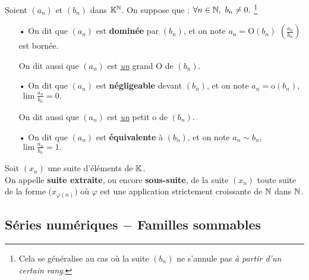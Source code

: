 \noindent Soient $(a_n)$ et $(b_n)$ dans $\mathbb{K}^{\mathbb{N}}$. On suppose que : \(\forall n\in \mathbb{N},\ b_n\neq 0 . \ \)\footnote{Cela se généralise au cas où la suite $(b_n)$ ne s'annule pas \emph{à partir d'un certain rang}.}\vspace{-0.2cm}
\begin{itemize}[leftmargin=0.5cm]
    \item[•] On dit que $(a_n)$ est \textbf{dominée} par $(b_n)$, et on note \(a_n=\text{O}(b_n)\) \ssi \(\displaystyle \left( \frac{a_n}{b_n} \right)\) est bornée.\\
    \begin{small}
        On dit aussi que \((a_n)\) est \underline{\emph{un}} grand O de \((b_n)\).
    \end{small}
    \vspace{0.1cm}
    
    \item[•] On dit que $(a_n)$ est \textbf{négligeable} devant $(b_n)$, et on note \(a_n=\text{o}(b_n)\), \ssi \(\ \displaystyle \lim \frac{a_n}{b_n}=0.  \)\\
    \begin{small}
        On dit aussi que \((a_n)\) est \underline{\emph{un}} petit o de \((b_n)\).
    \end{small}
    \vspace{0.1cm}
    
    \item[•] On dit que \((a_n)\) est \textbf{équivalente} à \((b_n)\), et on note \(a_n\sim b_n\), \ssi \(\ \displaystyle \lim\frac{a_n}{b_n}=1. \) 
\end{itemize}

\vspace{0.8cm}

Soit \((x_n)\) une suite d'éléments de \(\mathbb{K}\). \\
On appelle \textbf{suite extraite}, ou encore \textbf{sous-suite}, de la suite \((x_n)\) toute suite de la forme \(\displaystyle \bigl(x_{\varphi (n)}\bigr)\) où \(\varphi\) est une application strictement croissante de \(\mathbb{N}\) dans \(\mathbb{N}\).

\vspace{1.3cm}

\subsection{Séries numériques $-$ Familles sommables}

